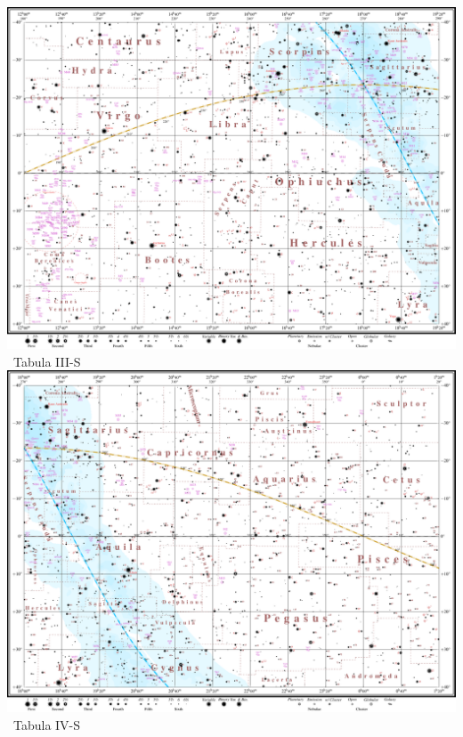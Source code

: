 \documentclass[10pt,landscape,oneside]{article}
\begin{document}
\begin{center}
\clearpage
%
\noindent\includegraphics[height=0.963\textheight]{TabulaV_S.pdf}\\[-0.985\textheight]\hfill\large~Tabula III-S\hspace{25mm}
\clearpage
%
\noindent\includegraphics[height=0.963\textheight]{TabulaVI_S.pdf}\\[-0.985\textheight]\hfill\large~Tabula IV-S\hspace{25mm}
\clearpage
%

\end{center}
\end{document}
